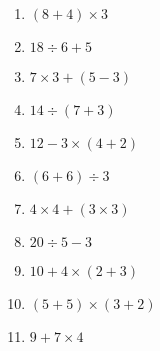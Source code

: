 \documentclass{article}
\begin{document}
\begin{enumerate}
\item \quad \( (8 + 4) \times 3 \)
\vspace{45pt}
\hline
\vspace{5pt}

\item \quad \( 18 \div 6 + 5 \)
\vspace{45pt}
\hline
\vspace{5pt}

\item \quad \( 7 \times 3 + (5 - 3) \)
\vspace{45pt}
\hline
\vspace{5pt}

\item \quad \( 14 \div (7 + 3) \)
\vspace{45pt}
\hline
\vspace{5pt}

\item \quad \( 12 - 3 \times (4 + 2) \)
\vspace{45pt}
\hline
\vspace{5pt}

\item \quad \( (6 + 6) \div 3 \)
\vspace{45pt}
\hline
\vspace{5pt}

\item \quad \( 4 \times 4 + (3 \times 3) \)
\vspace{45pt}
\hline
\vspace{5pt}

\item \quad \( 20 \div 5 - 3 \)
\vspace{45pt}
\hline
\vspace{5pt}

\item \quad \( 10 + 4 \times (2 + 3) \)
\vspace{45pt}
\hline
\vspace{5pt}

\item \quad \( (5 + 5) \times (3 + 2) \)
\vspace{45pt} 
\vspace{5pt}

\item \quad \( 9 + 7 \times 4 \)
\vspace{45pt} 
\hline
\vspace{5pt}


\end{enumerate}
\end{document}

